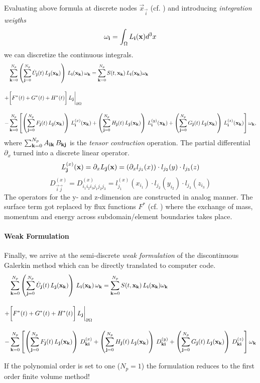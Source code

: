 Evaluating above formula at discrete nodes $\vec{x}_{\vec{i}}$ (cf.
) and introducing \emph{integration weigths}
\begin{equation}
\label{eqn:mass-matrix}
    \omega_{\mathbf{i}} = \int_{\Omega} L_{\mathbf{i}}(\mathbf{x}) d^3 x
\end{equation}
we can discretize the continuous integrals.
\begin{align}
     &\sumK \left(\sumJ \UJ \, \LJK \right) \, \LIK \,\wK = \sumK \STXK \, \LIK \wK \nonumber \br
    +&\bigg[ F^*(t) + G^*(t) + H^*(t)\bigg] \, L_{\vec{j}}\bigg|_{\partial\Omega} \br
    -&\sumK \left[
          \left(\sumJ \FJ \, \LJK \right) \, \LXIK 
        + \left(\sumJ \HJ \, \LJK \right) \, \LYIK
        + \left(\sumJ \GJ \, \LJK \right) \, \LZIK \right] \wK, \nonumber
\end{align}
where $\sum^{N_p}_{\mathbf{k}=0} A_{\mathbf{i}\mathbf{k}} \, B_{\mathbf{k}\mathbf{j}}$ is the \emph{tensor
contraction} operation.  The partial differential
$\partial_x$ turned into a discrete linear operator.
\newcommand{\DXKI}{D^{(x)}_{\vec{k}\vec{i}}}
\newcommand{\DYKI}{D^{(y)}_{\vec{k}\vec{i}}}
\newcommand{\DZKI}{D^{(z)}_{\vec{k}\vec{i}}}
\begin{equation}
    L^{(x)}_{\mathbf{j}}(\mathbf{x}) = \partial_x L_{\mathbf{j}}(\mathbf{x}) = (\partial_x l_{j_1}(x)) \cdot l_{j_2}(y) \cdot l_{j_3}(z)
\end{equation}
\begin{equation}
    D^{(x)}_{\vec{i}\vec{j}} = D^{(x)}_{i_1i_2i_3j_1j_2j_3} = l^{(x)}_{j_1}(x_{i_1})\cdot l_{j_2}(y_{i_2}) \cdot l_{j_3}(z_{i_3})
\end{equation}
The operators for the y- and z-dimension are constructed in analog manner.  The
surface term got replaced by flux functions $F^*$ (cf. )
where the exchange of mass, momentum and energy across subdomain/element
boundaries takes place.

\paragraph{Weak Formulation}
Finally, we arrive at the semi-discrete \emph{weak formulation} of the
discontinuous Galerkin method which can be directly translated to computer
code.
\begin{align}
\label{eqn:semi-discrete-weak-formulation}
     &\sumK \left(\sumJ \UJ \, \LJK \right) \, \LIK \,\wK = \sumK \STXK \, \LIK \wK \nonumber \br
    +&\bigg[ F^*(t) + G^*(t) + H^*(t)\bigg]\, L_{\vec{j}}\bigg|_{\partial\Omega} \br
    -&\sumK \left[
          \left(\sumJ \FJ \, \LJK \right) \, \DXKI 
        + \left(\sumJ \HJ \, \LJK \right) \, \DYKI
        + \left(\sumJ \GJ \, \LJK \right) \, \DZKI \right] \wK \nonumber
\end{align}

\remark If the polynomial order is set to one ($N_p = 1$) the formulation reduces
to the first order finite volume method!
